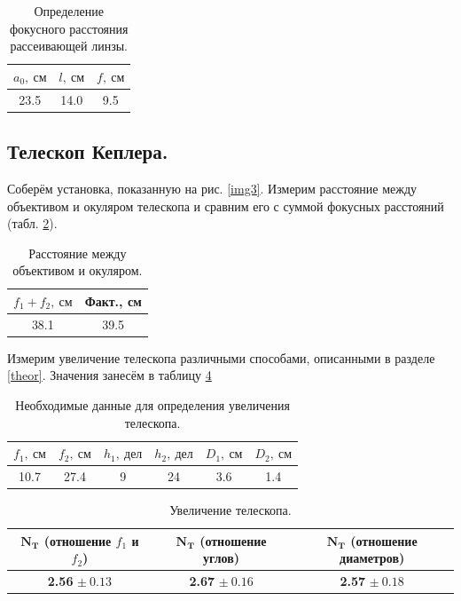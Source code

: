 \documentclass[a4paper, 12pt, twoside]{article}
\begin{document}
\begin{table}[H]
	\centering
	\caption{Определение фокусного расстояния рассеивающей линзы.}
	\label{t3}
	\begin{tabular}{c|c|c}\toprule
		$a_0,~\text{см}$ & $l,~\text{см}$ & $f,~\text{см}$ \\ \midrule
		23.5             & 14.0           & 9.5        \\ \bottomrule   
	\end{tabular}
\end{table}
	
\subsection{Телескоп Кеплера.}

Соберём установка, показанную на рис. \ref{img3}. Измерим расстояние между объективом и окуляром телескопа и сравним его с суммой фокусных расстояний (табл. \ref{t4}).

\begin{table}[H]
	\centering
	\caption{Расстояние между объективом и окуляром.}
	\label{t4}
	\begin{tabular}{c|c} \toprule
		$f_1+f_2,~\text{см}$ & Факт., см \\ \midrule
		38.1      & 39.5  \\ \bottomrule
	\end{tabular}
\end{table}

 Измерим увеличение телескопа различными способами, описанными в разделе \ref{theor}. Значения занесём в таблицу \ref{t6}
 
 \begin{table}[H]
 	\centering
 	\caption{Необходимые данные для определения увеличения телескопа.}
 	\label{t5}
 	\begin{tabular}{c|c|c|c|c|c} \toprule
 		$f_1,~\text{см}$ & $f_2,~\text{см}$ & $h_1,~\text{дел}$ & $h_2,~\text{дел}$ & $D_1,~\text{см}$ & $D_2,~\text{см}$ \\ \midrule
 		10.7             & 27.4             & 9                 & 24                & 3.6              & 1.4    \\ \bottomrule         
 	\end{tabular}
 \end{table}

\begin{table}[H]
	\centering
	\caption{Увеличение телескопа.}
	\label{t6}
	\begin{tabular}{c|c|c} \toprule
		$\mathbf{N_T}$ (отношение $f_1$ и $f_2$) & $\mathbf{N_T}$ (отношение углов) & $\mathbf{N_T}$ (отношение диаметров) \\ \midrule
		\textbf{2.56} $\pm ~0.13$                          & \textbf{2.67} $\pm~0.16$                  & \textbf{2.57} $\pm~0.18$     \\ \bottomrule                 
	\end{tabular}
\end{table}
\end{document}
